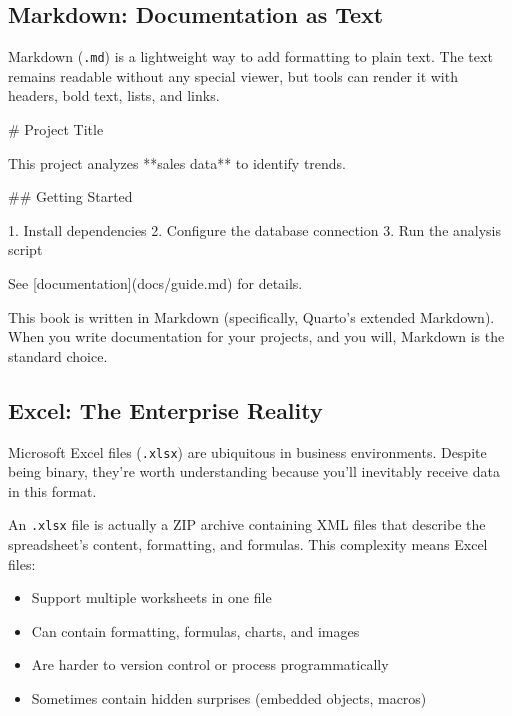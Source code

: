 \documentclass[
  letterpaper,
  DIV=11,
  numbers=noendperiod]{scrreprt}
\newenvironment{Shaded}{\begin{snugshade}}{\end{snugshade}}
\newcommand{\CommentTok}[1]{\textcolor[rgb]{0.37,0.37,0.37}{#1}}
\newcommand{\FunctionTok}[1]{\textcolor[rgb]{0.28,0.35,0.67}{#1}}
\newcommand{\NormalTok}[1]{\textcolor[rgb]{0.00,0.23,0.31}{#1}}
\newcommand{\OtherTok}[1]{\textcolor[rgb]{0.00,0.23,0.31}{#1}}
\newcommand{\SpecialStringTok}[1]{\textcolor[rgb]{0.13,0.47,0.30}{#1}}
\providecommand{\tightlist}{%
  \setlength{\itemsep}{0pt}\setlength{\parskip}{0pt}}
\begin{document}
\subsection{Markdown: Documentation as
Text}\label{markdown-documentation-as-text}

Markdown (\texttt{.md}) is a lightweight way to add formatting to plain
text. The text remains readable without any special viewer, but tools
can render it with headers, bold text, lists, and links.

\begin{codelisting}

\caption{\texttt{README.md}}

\begin{Shaded}
\begin{Highlighting}[]
\FunctionTok{\# Project Title}

\NormalTok{This project analyzes **sales data** to identify trends.}

\FunctionTok{\#\# Getting Started}

\SpecialStringTok{1. }\NormalTok{Install dependencies}
\SpecialStringTok{2. }\NormalTok{Configure the database connection}
\SpecialStringTok{3. }\NormalTok{Run the analysis script}

\NormalTok{See }\CommentTok{[}\OtherTok{documentation}\CommentTok{](docs/guide.md)}\NormalTok{ for details.}
\end{Highlighting}
\end{Shaded}

\end{codelisting}

This book is written in Markdown (specifically, Quarto's extended
Markdown). When you write documentation for your projects, and you will,
Markdown is the standard choice.

\subsection{Excel: The Enterprise
Reality}\label{excel-the-enterprise-reality}

Microsoft Excel files (\texttt{.xlsx}) are ubiquitous in business
environments. Despite being binary, they're worth understanding because
you'll inevitably receive data in this format.

An \texttt{.xlsx} file is actually a ZIP archive containing XML files
that describe the spreadsheet's content, formatting, and formulas. This
complexity means Excel files:

\begin{itemize}
\tightlist
\item
  Support multiple worksheets in one file
\item
  Can contain formatting, formulas, charts, and images
\item
  Are harder to version control or process programmatically
\item
  Sometimes contain hidden surprises (embedded objects, macros)
\end{itemize}
\end{document}
